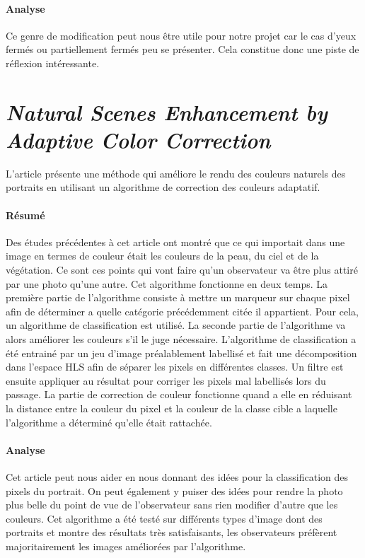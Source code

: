 \documentclass[11pt, french]{report-rd-info}
\begin{document}
\paragraph{Analyse}
Ce genre de modification peut nous être utile pour notre projet car le cas d'yeux fermés ou partiellement fermés peu se présenter. Cela constitue donc une piste de réflexion intéressante.

\section{\emph{Natural Scenes Enhancement by Adaptive Color Correction}}
L'article \cite{Nacarri} présente une méthode qui améliore le rendu des couleurs naturels des portraits en utilisant un algorithme de correction des couleurs adaptatif. 

\paragraph{Résumé}
Des études précédentes à cet article ont montré que ce qui importait dans une image en termes de couleur était les couleurs de la peau, du ciel et de la végétation. Ce sont ces points qui vont faire qu'un observateur va être plus attiré par une photo qu'une autre. Cet algorithme fonctionne en deux temps. La première partie de l'algorithme consiste à mettre un marqueur sur chaque pixel afin de déterminer a quelle catégorie précédemment citée il appartient. Pour cela, un algorithme de classification est utilisé. La seconde partie de l'algorithme va alors améliorer les couleurs s'il le juge nécessaire.
L'algorithme de classification a été entrainé par un jeu d'image préalablement labellisé et fait une décomposition dans l'espace HLS afin de séparer les pixels en différentes classes. Un filtre est ensuite appliquer au résultat pour corriger les pixels mal labellisés lors du passage.
La partie de correction de couleur fonctionne quand a elle en réduisant la distance entre la couleur du pixel et la couleur de la classe cible a laquelle l'algorithme a déterminé qu'elle était rattachée.

\paragraph{Analyse}
Cet article peut nous aider en nous donnant des idées pour la classification des pixels du portrait. 
On peut également y puiser des idées pour rendre la photo plus belle du point de vue de l'observateur sans rien modifier d'autre que les couleurs.
Cet algorithme a été testé sur différents types d'image dont des portraits et montre des résultats très satisfaisants, les observateurs préfèrent majoritairement les images améliorées par l'algorithme.
\end{document}

